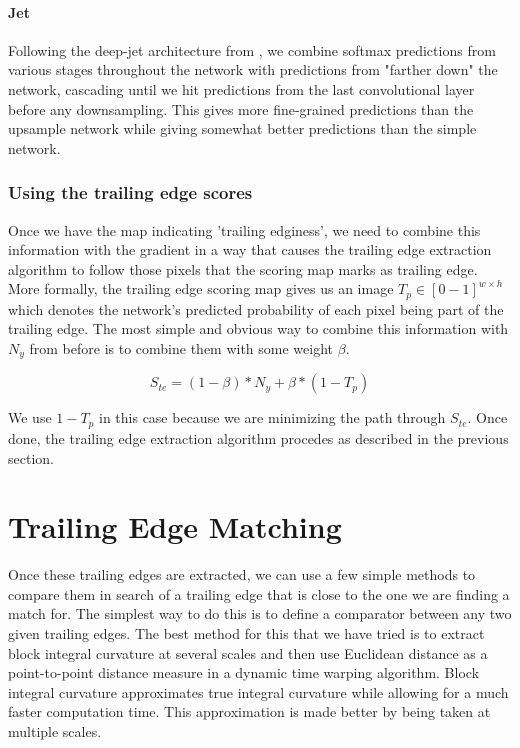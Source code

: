 
\paragraph{Jet}
Following the deep-jet architecture from \cite{long2015fully}, we combine softmax predictions from various stages throughout the network with predictions from "farther down" the network, cascading until we hit predictions from the last convolutional layer before any downsampling.
This gives more fine-grained predictions than the upsample network while giving somewhat better predictions than the simple network.


\subsubsection{Using the trailing edge scores}

Once we have the map indicating 'trailing edginess', we need to combine this information with the gradient in a way that causes the trailing edge extraction algorithm to follow those pixels that the scoring map marks as trailing edge.
More formally, the trailing edge scoring map gives us an image $T_p \in [0-1]^{w \times h}$ which denotes the network's predicted probability of each pixel being part of the trailing edge.
The most simple and obvious way to combine this information with $N_y$ from before is to combine them with some weight $\beta$.

\begin{equation}
S_{te} = (1 - \beta)*N_y + \beta*(1 - T_p)
\end{equation}

We use $1 - T_p$ in this case because we are minimizing the path through $S_{te}$.
Once done, the trailing edge extraction algorithm procedes as described in the previous section.

\section{Trailing Edge Matching}

Once these trailing edges are extracted, we can use a few simple methods to compare them in search of a trailing edge that is close to the one we are finding a match for.
The simplest way to do this is to define a comparator between any two given trailing edges.
The best method for this that we have tried is to extract block integral curvature at several scales and then use Euclidean distance as a point-to-point distance measure in a dynamic time warping algorithm.
Block integral curvature approximates true integral curvature while allowing for a much faster computation time.
This approximation is made better by being taken at multiple scales.

